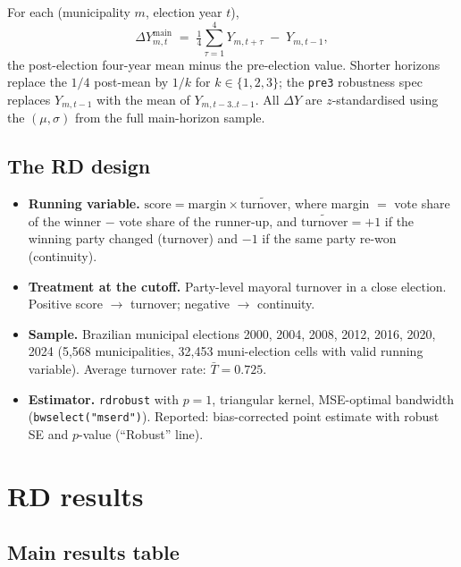 \documentclass[11pt]{article}
\begin{document}
For each (municipality $m$, election year $t$),
\[
\Delta Y^{\text{main}}_{m,t}
  \;=\; \tfrac{1}{4}\sum_{\tau=1}^{4} Y_{m,t+\tau}
  \;-\; Y_{m,t-1},
\]
the post-election four-year mean minus the pre-election value. Shorter
horizons replace the $1/4$ post-mean by $1/k$ for $k\in\{1,2,3\}$; the
\texttt{pre3} robustness spec replaces $Y_{m,t-1}$ with the mean of
$Y_{m,t-3..t-1}$. All $\Delta Y$ are $z$-standardised using the
$(\mu,\sigma)$ from the full main-horizon sample.


\subsection{The RD design}

\begin{itemize}
\item \textbf{Running variable.} $\text{score} = \text{margin} \times
  \widetilde{\text{turnover}}$, where margin $=$ vote share of the winner
  $-$ vote share of the runner-up, and
  $\widetilde{\text{turnover}} = +1$ if the winning party changed
  (turnover) and $-1$ if the same party re-won (continuity).
\item \textbf{Treatment at the cutoff.} Party-level mayoral turnover in a
  close election. Positive score $\to$ turnover; negative $\to$ continuity.
\item \textbf{Sample.} Brazilian municipal elections 2000, 2004, 2008, 2012, 2016, 2020, 2024
  (5,568 municipalities, 32,453 muni-election cells with valid
  running variable). Average turnover rate: $\bar T = 0.725$.
\item \textbf{Estimator.} \texttt{rdrobust} with $p=1$, triangular kernel,
  MSE-optimal bandwidth (\texttt{bwselect("mserd")}). Reported: bias-corrected
  point estimate with robust SE and $p$-value (``Robust'' line).
\end{itemize}

\clearpage


\section{RD results}

\subsection{Main results table}
\end{document}
